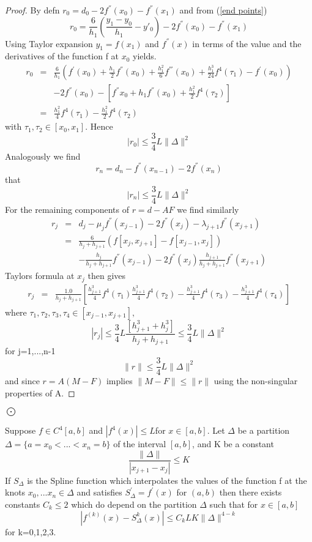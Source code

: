 \begin{proof}
By defn $r_0=d_0-2f^{''}(x_0)-f^{''}(x_1)$ and from (\ref{end points})
\[
r_0 = \frac{6}{h_1}\left(\frac{y_1-y_0}{h_1} - y'_0\right) -2f^{''}(x_0) - f^{''}(x_1) \]
Using Taylor expansion $y_1=f(x_1)$ and $f^{''}(x)$ in terms of the value and the derivatives of the function f at $x_0$ yields.
\begin{eqnarray*}
r_0&=& \frac{6}{h_1}(f^{'}(x_0)+\frac{h_{1}}{2}f^{''}(x_0)+\frac{h_1^2}{6}f^{'''}(x_0) + \frac{h_{1}^3}{24}f^{4}(\tau_1)-f^{'}(x_0) )\\
& & -2f^{''}(x_0) - [f^{''}x_0+h_1f^{''}(x_0)+\frac{h_1^2}{2}f^{4}(\tau_2)]\\
&=& \frac{h_1^2}{4}f^{4}(\tau_1) - \frac{h_{1}^2}{2}f^{4}(\tau_2)
\end{eqnarray*}
with $\tau_1,\tau_2 \in [x_0,x_1]$. Hence
\[ |r_0| \leq \frac{3}{4} L \lVert \Delta\rVert ^2 \]
Analogously we find
\[
r_n = d_n - f^{''}(x_{n-1})-2f^{''}(x_n) \]
that 
\[ |r_n| \leq \frac{3}{4} L \lVert \Delta\rVert ^2 \]
For the remaining components of $r=d-AF$ we find similarly
\begin{eqnarray*}
r_j&=&d_j - \mu_jf^{''}(x_{j-1})-2f^{''}(x_j) -\lambda_{j+1}f^{''}(x_{j+1})\\
&=&\frac{6}{h_j+h_{j+1}}\left(f[x_{j},x_{j+1}]-f[x_{j-1},x_{j}]\right)\\ & & -
\frac{h_{j}}{h_{j}+h_{j+1}}f^{''}(x_{j-1}) - 2f^{''}(x_j)
\frac{h_{j+1}}{h_{j}+h_{j+1}}f^{''}(x_{j+1}) 
\end{eqnarray*}
Taylors formula at $x_j$ then gives
\begin{eqnarray*}
r_j & =& \frac{1.0}{h_j+h_{j+1}}\left[ \frac{h_{j+1}^3}{4}f^{4}(\tau_1 )  \frac{h_{j+1}^3}{4}f^{4}(\tau_2 )  -\frac{h_{j+1}^3}{4}f^{4}(\tau_3 )  -\frac{h_{j+1}^3}{4}f^{4}(\tau_4 ) \right]
\end{eqnarray*}
where $\tau_1, \tau_2, \tau_3,\tau_4 \in [x_{j-1},x_{j+1}],$
\[ |r_j| \leq \frac{3}{4}L \frac{[h_{j+1}^3+h_j^3]}{h_j+h_{j+1}}\leq \frac{3}{4}L\lVert \Delta\rVert ^2 \]
for j=1,...,n-1
\[
\lVert r\rVert  \leq \frac{3}{4} L \lVert  \Delta \rVert ^2 \]
and since $r=A(M-F)$ implies $\lVert M-F\rVert  \leq \lVert r\rVert $ using the non-singular properties of A.
\end{proof} $\bigodot$
\begin{theorem}
Suppose 
$f \in C^{4}[a,b]$ and $ |f^{4}(x)| \leq L $for $x \in [a,b]$. Let $\Delta$ be a partition
$\Delta = \{ a=x_0 < ... < x_n = b \} $ of the interval $[a,b]$, and K be a constant
\[
\frac{\lVert \Delta\rVert }{|x_{j+1}-x_{j}|} \leq K
\]
If $S_{\Delta}$ is the Spline function which interpolates the values of the function f at the knots $x_0,...x_n \in \Delta$
and satisfies $S^{'}_{\Delta} = f^{'}(x)$ for $(a,b) $ then there exists constants $C_{k} \leq 2$ which do depend on the partition $\Delta$ such that for $ x \in [a,b]$
\[
|f^{(k)}(x)-S_{\Delta}^{k}(x)|\leq C_{k}LK\lVert \Delta\rVert ^{4-k} \]
for k=0,1,2,3.
\end{theorem}
